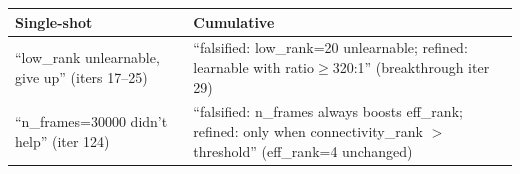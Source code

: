 \documentclass[10pt,twocolumn]{article}
\begin{document}
\begin{table}[h!]
\centering
\small
\begin{tabularx}{\textwidth}{XX}
\toprule
\textbf{Single-shot} & \textbf{Cumulative} \\
\midrule
``low\_rank unlearnable, give up'' (iters 17--25)
&
``falsified: low\_rank=20 unlearnable; refined: learnable with ratio$\geq$320:1'' (breakthrough iter 29)
\\
\midrule
``n\_frames=30000 didn't help'' (iter 124)
&
``falsified: n\_frames always boosts eff\_rank; refined: only when connectivity\_rank $>$ threshold'' (eff\_rank=4 unchanged)
\\
\bottomrule
\end{tabularx}
\end{table}
\end{document}
